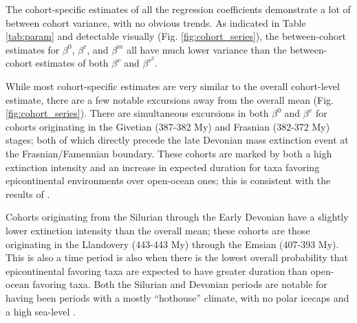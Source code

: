 \documentclass{article}
\begin{document}
The cohort-specific estimates of all the regression coefficients demonstrate a lot of between cohort variance, with no obvious trends. As indicated in Table \ref{tab:param} and detectable visually (Fig. \ref{fig:cohort_series}), the between-cohort estimates for \(\beta^{0}\), \(\beta^{r}\), and \(\beta^{m}\) all have much lower variance than the between-cohort estimates of both \(\beta^{v}\) and \(\beta^{v^{2}}\).

While most cohort-specific estimates are very similar to the overall cohort-level estimate, there are a few notable excursions away from the overall mean (Fig. \ref{fig:cohort_series}). There are simultaneous excursions in both \(\beta^{0}\) and \(\beta^{v}\) for cohorts originating in the Givetian (387-382 My) and Frasnian (382-372 My) stages; both of which directly precede the late Devonian mass extinction event at the Frasnian/Famennian boundary. These cohorts are marked by both a high extinction intensity and an increase in expected duration for taxa favoring epicontinental environments over open-ocean ones; this is consistent with the results of \citet{Miller2009a}.

Cohorts originating from the Silurian through the Early Devonian have a slightly lower extinction intensity than the overall mean; these cohorts are those originating in the Llandovery (443-443 My) through the Emsian (407-393 My). This is also a time period is also when there is the lowest overall probability that epicontinental favoring taxa are expected to have greater duration than open-ocean favoring taxa. Both the Silurian and Devonian periods are notable for having been periods with a mostly ``hothouse'' climate, with no polar icecaps and a high sea-level \citep{Edwards1985,Joachimski2009,Munnecke2010}.
\end{document}
